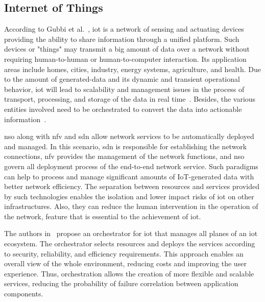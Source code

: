 \subsection{Internet of Things}
According to Gubbi et al.~\cite{Gubbi2013InternetDirections}, \gls{iot} is a network of sensing and actuating devices providing the ability to share information through a unified platform. Such devices or "things" may transmit a big amount of data over a network without requiring human-to-human or human-to-computer interaction. Its application areas include homes, cities, industry, energy systems, agriculture, and health. Due to the amount of generated-data and its dynamic and transient operational behavior, \gls{iot} will lead to scalability and management issues in the process of transport, processing, and storage of the data in real time~\cite{Mijumbi2016NetworkChallenges}. Besides, the various entities involved need to be orchestrated to convert the data into actionable information~\cite{Consel2017InternetOrchestration}. 

\gls{nso} along with \gls{nfv} and \gls{sdn} allow network services to be automatically deployed and managed. In this scenario, \gls{sdn} is responsible for establishing the network connections, \gls{nfv} provides the management of the network functions, and \gls{nso} govern all deployment process of the end-to-end network service. Such paradigms can help to process and manage significant amounts of IoT-generated data with better network efficiency. The separation between resources and services provided by such technologies enables the isolation and lower impact risks of \gls{iot} on other infrastructures. Also, they can reduce the human intervention in the operation of the network, feature that is essential to the achievement of \acrlong{iot}.

The authors in~\cite{Wen2017FogServices} propose an orchestrator for \acrlong{iot} that manages all planes of an \gls{iot} ecosystem. The orchestrator selects resources and deploys the services according to security, reliability, and efficiency requirements. This approach enables an overall view of the whole environment, reducing costs and improving the user experience. Thus, orchestration allows the creation of more flexible and scalable services, reducing the probability of failure correlation between application components.